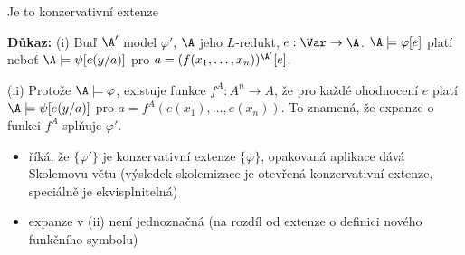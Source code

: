\documentclass{beamer}
\begin{document}
\begin{frame}{Je to konzervativní extenze}

    \pause

    \pause
    \textbf{Důkaz:} \pause \alert{(i)} Buď $\A'$ model $\varphi'$, $\A$ jeho $L$-redukt, $e:\Var\to\A$. $\A\models\varphi[e]$ platí neboť $\A\models\psi[e(y/a)]$ pro $a=(f(x_1,\dots,x_n))^{\A'}[e]$.
    
    \pause
    \alert{(ii)} Protože $\A\models\varphi$, existuje funkce $f^A:A^n\to A$, že pro každé ohodnocení $e$ platí $\A\models \psi[e(y/a)]$ pro $a=f^A(e(x_1),\dots,e(x_n))$. To znamená, že expanze o funkci $f^A$ splňuje $\varphi'$.\hfill\qedsymbol 
    \begin{itemize}
        \item \pause říká, že $\{\varphi'\}$ je konzervativní extenze $\{\varphi\}$, opakovaná aplikace dává \alert{Skolemovu větu} (výsledek skolemizace je otevřená konzervativní extenze, speciálně je ekvisplnitelná)  
        \item \pause expanze v (ii) není jednoznačná (na rozdíl od extenze o definici nového funkčního symbolu)      
    \end{itemize}
   
\end{frame}
\end{document}
